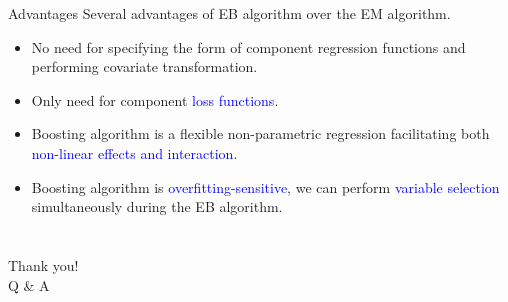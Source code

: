 \documentclass[professionalfont]{beamer}
\def\Q{{\mathbb Q}}  %
\newcommand{\blue}[1]{\textcolor{blue}{#1}}
\begin{document}
\begin{frame}{Advantages}
	Several advantages of EB algorithm over the EM algorithm.
	\begin{itemize}
		\item No need for specifying the form of component regression functions and performing covariate transformation.
		\item Only need for component \blue{loss functions}.
		\item Boosting algorithm is a flexible non-parametric regression facilitating both \blue{non-linear effects and interaction}.
		\item  Boosting algorithm is \blue{overfitting-sensitive}, we can perform \blue{variable selection} simultaneously during the EB algorithm.
	\end{itemize}
\end{frame}

\section*{}
\begin{frame}
	\centering
	\Huge{Thank you! \\Q \& A}
\end{frame}
\end{document}
